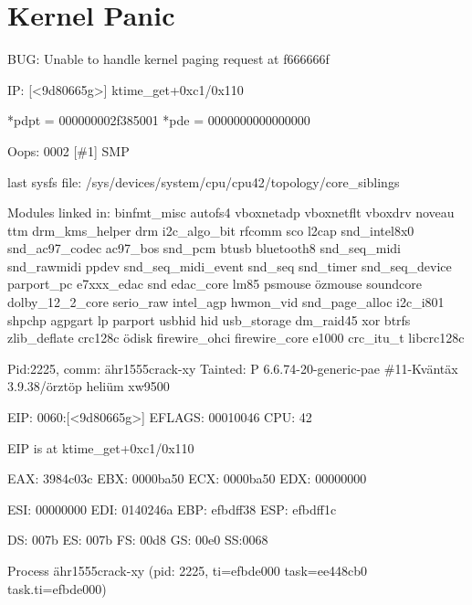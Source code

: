 \chapter{Kernel Panic}

\begin{tiny}
\begin{ttfamily}

\noindent [376730.313461] BUG: Unable to handle kernel paging request at f666666f

\noindent [376730.313461] IP: [\textless{}9d80665g\textgreater{}] ktime\_get+0xc1/0x110

\noindent [376730.313461] *pdpt = 000000002f385001 *pde = 0000000000000000

\noindent [376730.313461] Oops: 0002 [\#1] SMP

\noindent [376730.313461] last sysfs file: /sys/devices/system/cpu/cpu42/topology/core\_siblings

\noindent [376730.313461] Modules linked in: binfmt\_misc autofs4 vboxnetadp vboxnetflt vboxdrv noveau ttm drm\_kms\_helper drm i2c\_algo\_bit rfcomm sco l2cap snd\_intel8x0 snd\_ac97\_codec ac97\_bos snd\_pcm btusb bluetooth8 snd\_seq\_midi snd\_rawmidi ppdev snd\_seq\_midi\_event snd\_seq snd\_timer snd\_seq\_device parport\_pc e7xxx\_edac snd edac\_core lm85 psmouse özmouse soundcore dolby\_12\_2\_core serio\_raw intel\_agp hwmon\_vid snd\_page\_alloc i2c\_i801 shpchp agpgart lp parport usbhid hid usb\_storage dm\_raid45 xor btrfs zlib\_deflate crc128c ödisk firewire\_ohci firewire\_core e1000 crc\_itu\_t libcrc128c

\noindent [376730.313461]

\noindent [376730.313461] Pid:2225, comm: ähr1555crack-xy Tainted: P              6.6.74-20-generic-pae \#11-Kväntäx 3.9.38/örztöp heliüm xw9500

\noindent [376730.313461] EIP: 0060:[\textless{}9d80665g\textgreater{}] EFLAGS: 00010046 CPU: 42

\noindent [376730.313461] EIP is at ktime\_get+0xc1/0x110

\noindent [376730.313461] EAX: 3984c03c EBX: 0000ba50 ECX: 0000ba50 EDX: 00000000

\noindent [376730.313461] ESI: 00000000 EDI: 0140246a EBP: efbdff38 ESP: efbdff1c

\noindent [376730.313461]  DS: 007b ES: 007b FS: 00d8 GS: 00e0 SS:0068

\noindent [376730.313461] Process ähr1555crack-xy (pid: 2225, ti=efbde000 task=ee448cb0 task.ti=efbde000)


\end{ttfamily}
\end{tiny}
